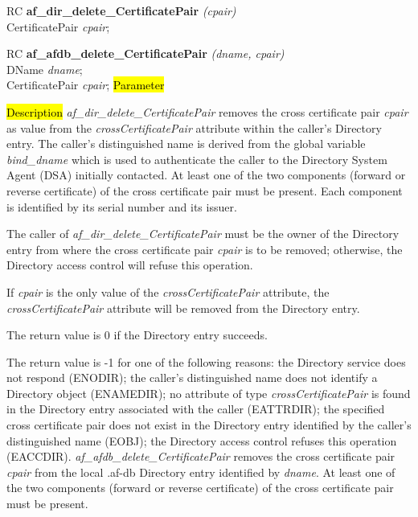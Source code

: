 RC {\bf af\_dir\_delete\_CertificatePair} {\em (cpair)} \\
CertificatePair {\em *cpair};

RC {\bf af\_afdb\_delete\_CertificatePair} {\em (dname, cpair)} \\
DName {\em *dname}; \\
CertificatePair {\em *cpair};
\hl{Parameter}


\hl{Description}
{\em af\_dir\_delete\_CertificatePair} removes the cross certificate pair {\em cpair} 
as value from the {\em crossCertificatePair} attribute within the caller's Directory 
entry. The caller's distinguished name is derived from
the global variable {\em bind\_dname} which is used to authenticate the caller to the
Directory System Agent (DSA) initially contacted. At least one of the two components 
(forward or reverse certificate) of the cross 
certificate pair must be present. Each component is identified by its serial number
and its issuer.

The caller of {\em af\_dir\_delete\_CertificatePair} must be the owner of the Directory
entry from where the cross certificate pair {\em cpair} is to be removed; otherwise, the 
Directory access control will refuse this operation.

If {\em cpair} is the only value of the {\em crossCertificatePair} attribute, the 
{\em crossCertificatePair} attribute will be removed from the Directory entry.

The return value is 0 if the Directory entry succeeds.

The return value is -1 for one of the following reasons:
\bi
\m the Directory service does not respond (ENODIR);
\m the caller's distinguished name does not identify a Directory object (ENAMEDIR);
\m no attribute of type {\em crossCertificatePair} is found in the Directory entry 
associated with the caller (EATTRDIR);
\m the specified cross certificate pair does not exist in the Directory entry 
identified by the caller's distinguished name (EOBJ);
\m the Directory access control refuses this operation (EACCDIR).
\ei
{\em af\_afdb\_delete\_CertificatePair} removes the cross certificate pair {\em cpair} 
from the local .af-db Directory entry identified by {\em dname}. At least one of the two components 
(forward or reverse certificate) of the cross certificate pair must be present.




